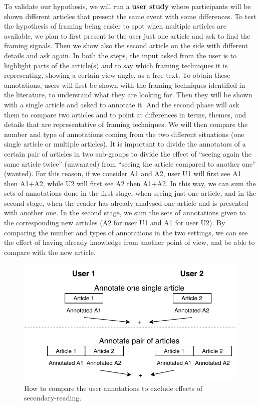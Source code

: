 

To validate our hypothesis, we will run a \textbf{user study} where participants will be shown different articles that present the same event with some differences.
To test the hypothesis of framing being easier to spot when multiple articles are available, we plan to first present to the user just one article and ask to find the framing signals. Then we show also the second article on the side with different details and ask again.
In both the steps, the input asked from the user is to highlight parts of the article(s) and to say which framing techniques it is representing, showing a certain view angle, as a free text.
To obtain these annotations, users will first be shown with the framing techniques identified in the literature, to understand what they are looking for.
Then they will be shown with a single article and asked to annotate it. And the second phase will ask them to compare two articles and to point at differences in terms, themes, and details that are representative of framing techniques.
We will then compare the number and type of annotations coming from the two different situations (one single article or multiple articles).
It is important to divide the annotators of a certain pair of articles in two sub-groups to divide the effect of ``seeing again the same article twice'' (unwanted) from ``seeing the article compared to another one'' (wanted).
For this reason, if we consider A1 and A2, user U1 will first see A1 then A1+A2, while U2 will first see A2 then A1+A2.
In this way, we can sum the sets of annotations done in the first stage, when seeing just one article, and in the second stage, when the reader has already analysed one article and is presented with another one. In the second stage, we sum the sets of annotations given to the corresponding new articles (A2 for user U1 and A1 for user U2).
By comparing the number and types of annotations in the two settings, we can see the effect of having already knowledge from another point of view, and be able to compare with the new article.


\begin{figure}[!htb]
    \centering
    \includegraphics[width=0.7\linewidth]{figures/diagram-user-study-flow.pdf}
    \caption{How to compare the user annotations to exclude effects of secondary-reading.}
    \label{fig:user_study}
\end{figure}



